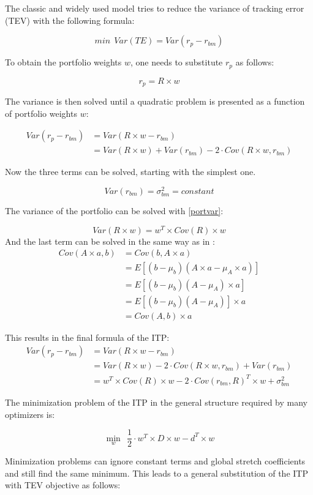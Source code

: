 \documentclass[
  oneside]{book}
\begin{document}
The classic and widely used model tries to reduce the variance of tracking error (TEV) with the following formula:

\[
 min \ \ Var(TE) = Var(r_{p}-r_{bm})
\]

To obtain the portfolio weights \(w\), one needs to substitute \(r_{p}\) as follows:

\[
  r_{p} = R \times w
\]

The variance is then solved until a quadratic problem is presented as a function of portfolio weights \(w\):

\begin{align*}
 Var(r_{p}-r_{bm}) &= Var(R \times w - r_{bm}) \\
 &= Var(R \times w) + Var(r_{bm}) - 2 \cdot Cov(R \times w,r_{bm}) 
\end{align*}

Now the three terms can be solved, starting with the simplest one.

\[
Var(r_{bm}) = \sigma_{bm}^2 = constant
\]

The variance of the portfolio can be solved with \ref{portvar}:

\[
Var(R \times w) = w^T \times Cov(R) \times w
\]
And the last term can be solved in the same way as in \citep{Eric2021}:
\begin{align*}
  Cov(A \times a, b) &= Cov(b, A \times a) \\
  &= E[(b-\mu_{b})(A \times a-\mu_{A} \times a)] \\
  &= E[(b-\mu_{b})(A-\mu_{A}) \times a] \\
  &= E[(b-\mu_{b})(A-\mu_{A})] \times a \\
  &= Cov(A,b) \times a
\end{align*}

This results in the final formula of the ITP:
\begin{align*}
  Var(r_{p}-r_{bm}) & = Var(R \times w - r_{bm}) \\
  & = Var(R \times w) - 2 \cdot Cov(R \times w,r_{bm}) + Var(r_{bm})  \\
  & = w^T \times Cov(R) \times w - 2 \cdot Cov(r_{bm}, R)^T \times w + \sigma_{bm}^2
  \label{eq:ITP}
\end{align*}

The minimization problem of the ITP in the general structure required by many optimizers is:

\[
  \min\limits_{w} \ \ \frac{1}{2} \cdot w^T \times D \times w -d^T \times w
\]

Minimization problems can ignore constant terms and global stretch coefficients and still find the same minimum. This leads to a general substitution of the ITP with TEV objective as follows:
\end{document}
